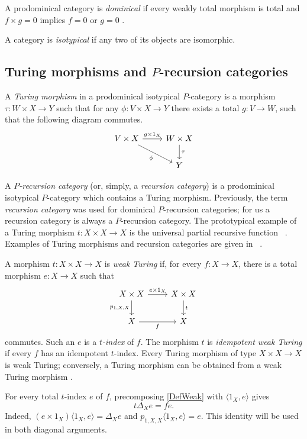 \documentclass[letterpaper,10pt]{amsart}
\theoremstyle{plain}
\theoremstyle{definition}
\newcommand{\MAP}[3]{{#1}:{#2}\rightarrow{#3}}
\begin{document}
A prodominical category is \textit{dominical} if every weakly total
morphism is total and $f\times g=0$ implies $f=0$ or $g=0$
\cite[p.~36]{leng}.

A category is \textit{isotypical} if any two of its objects are isomorphic.

\subsection{Turing morphisms and \texorpdfstring{$P$}{P}-recursion categories}
A {\it Turing morphism} in a prodominical isotypical $P$-category is a morphism %
$\MAP{\tau}{W\times X}{Y}$ such that for any $\MAP{\phi}{V\times
X}{Y}$ there exists a total $\MAP{g}{V}{W}$, such that the
following diagram commutes.
\[
\begin{tikzcd}
V\times X \arrow[r,"g\times1_X"] \arrow[dr,"\phi"']
  & W\times X \arrow[d,"\tau"] \\
  & Y
\end{tikzcd}
\]

A {\it $P$-recursion category} (or, simply, a {\it recursion
category}) is a prodominical isotypical $P$-category  which contains a Turing
morphism. Previously, the term {\it recursion category}
was used for dominical $P$-recursion categories; for us a recursion category
is always a $P$-recursion category. The prototypical example of a Turing morphism $\MAP{t}{X\times X}{X}$ is the universal partial recursive function ~\cite[Theorem II.1.8, page 132]{MR90d:03072}. Examples of Turing morphisms and recursion categories are given in ~\cite{MR88i:03078,MR90i:03046,MR92e:03067,MR93b:03103,MR95c:03110,leng}.

A morphism $t:X\times X\to X$ is \textit{weak Turing} if, for every
$f:X\to X$, there is a total morphism $e:X\to X$ such that
\begin{equation}\label{DefWeak}
\begin{tikzcd}
X\times X \arrow[r,"e\times1_X"] \arrow[d,"p_{1,X,X}"']
  & X\times X \arrow[d,"t"] \\
X \arrow[r,"f"'] & X
\end{tikzcd}
\end{equation}
commutes. Such an $e$ is a \textit{$t$-index} of $f$. The morphism $t$
is \textit{idempotent weak Turing} if every $f$ has an idempotent
$t$-index. Every Turing morphism of type $X\times X\to X$ is weak
Turing; conversely, a Turing morphism can be obtained from a weak Turing
morphism \cite[Lemma 9.1]{MR92e:03067}.

For every total $t$-index $e$ of $f$, precomposing
\eqref{DefWeak} with $\langle1_X,e\rangle$ gives
\begin{equation}\label{EqDiagonalIndex}
t\Delta_Xe=fe.
\end{equation}
Indeed, $(e\times1_X)\langle1_X,e\rangle=\Delta_Xe$ and
$p_{1,X,X}\langle1_X,e\rangle=e$. This identity will be used in
both diagonal arguments.
\end{document}
